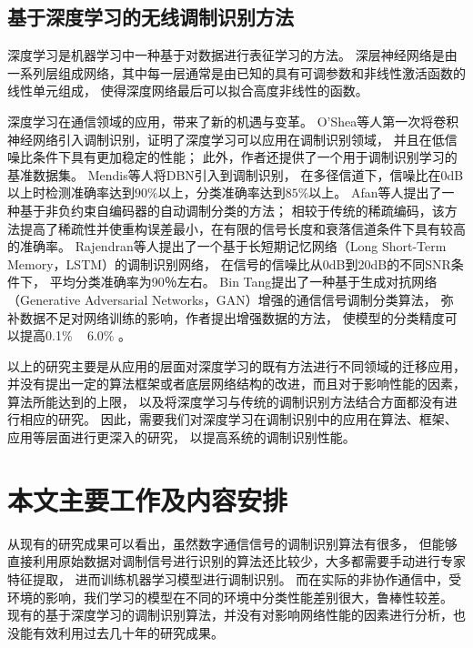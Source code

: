 \subsection{基于深度学习的无线调制识别方法}

深度学习是机器学习中一种基于对数据进行表征学习的方法。
深层神经网络是由一系列层组成网络，其中每一层通常是由已知的具有可调参数和非线性激活函数的线性单元组成，
使得深度网络最后可以拟合高度非线性的函数。\par
深度学习在通信领域的应用，带来了新的机遇与变革。
O'Shea等人第一次将卷积神经网络引入调制识别，证明了深度学习可以应用在调制识别领域，
并且在低信噪比条件下具有更加稳定的性能\cite{o2016convolutional}；
此外，作者还提供了一个用于调制识别学习的基准数据集\cite{o2016radio}。
Mendis等人将DBN引入到调制识别，
在多径信道下，信噪比在0dB以上时检测准确率达到$90\%$以上，分类准确率达到$85\%$以上\cite{mendis2016deep}。
Afan等人提出了一种基于非负约束自编码器的自动调制分类的方法\cite{ali2017automatic}；
相较于传统的稀疏编码，该方法提高了稀疏性并使重构误差最小，在有限的信号长度和衰落信道条件下具有较高的准确率。
Rajendran等人提出了一个基于长短期记忆网络（Long Short-Term Memory，LSTM）的调制识别网络，
在信号的信噪比从0dB到20dB的不同SNR条件下，
平均分类准确率为90％左右\cite{rajendran2017distributed}。
Bin Tang提出了一种基于生成对抗网络（Generative Adversarial Networks，GAN）增强的通信信号调制分类算法，
弥补数据不足对网络训练的影响，作者提出增强数据的方法，
使模型的分类精度可以提高0.1\% ~ 6.0\% \cite{8319926}。\par

以上的研究主要是从应用的层面对深度学习的既有方法进行不同领域的迁移应用，
并没有提出一定的算法框架或者底层网络结构的改进，而且对于影响性能的因素，算法所能达到的上限，
以及将深度学习与传统的调制识别方法结合方面都没有进行相应的研究。
因此，需要我们对深度学习在调制识别中的应用在算法、框架、应用等层面进行更深入的研究，
以提高系统的调制识别性能。\par

\section{本文主要工作及内容安排}
从现有的研究成果可以看出，虽然数字通信信号的调制识别算法有很多，
但能够直接利用原始数据对调制信号进行识别的算法还比较少，大多都需要手动进行专家特征提取，
进而训练机器学习模型进行调制识别。
而在实际的非协作通信中，受环境的影响，我们学习的模型在不同的环境中分类性能差别很大，鲁棒性较差。
现有的基于深度学习的调制识别算法，并没有对影响网络性能的因素进行分析，也没能有效利用过去几十年的研究成果。\par

